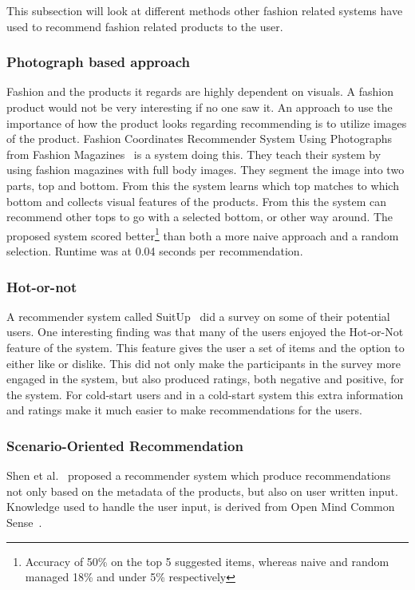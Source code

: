 This subsection will look at different methods other fashion related
systems have used to recommend fashion related products to the user.

\subsubsection{Photograph based approach}
    Fashion and the products it regards are highly dependent on visuals.  A fashion
    product would not be very interesting if no one saw it.  An approach to use the
    importance of how the product looks regarding recommending is to utilize images
    of the product.  Fashion Coordinates Recommender System Using Photographs from
    Fashion Magazines~\cite{Iwata:2011} is a system doing this.  They teach their
    system by using fashion magazines with full body images.  They segment the
    image into two parts, top and bottom.  From this the system learns which top
    matches to which bottom and collects visual features of the products.  From
    this the system can recommend other tops to go with a selected bottom, or other
    way around.  The proposed system scored better\footnote{Accuracy of 50\% on the
    top 5 suggested items, whereas naive and random managed 18\% and under 5\%
    respectively} than both a more naive approach and a random selection.  Runtime
    was at 0.04 seconds per recommendation.

\subsubsection{Hot-or-not}
    A recommender system called SuitUp~\cite{SuitUp} did a survey on some of their potential users.
    One interesting finding was that many of the users enjoyed the Hot-or-Not feature of the system.
    This feature gives the user a set of items and the option to either like or dislike.
    This did not only make the participants in the survey more engaged in the system, but also produced ratings, both negative and positive, for the system.
    For cold-start users and in a cold-start system this extra information and ratings make it much easier to make recommendations for the users.

\subsubsection{Scenario-Oriented Recommendation}
    Shen et al.~\cite{Shen:2007:AIG:1216295.1216368} proposed a recommender system which produce recommendations not only based on the metadata of the products, but also on user written input.
    Knowledge used to handle the user input, is derived from Open Mind Common Sense~\cite{Singh02openmind}.


